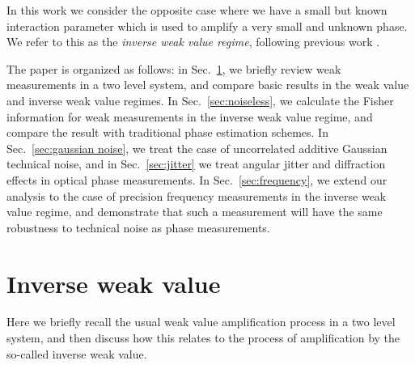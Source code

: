 In this work we consider the opposite case where we have a small but known interaction parameter which is used to amplify a very small and unknown phase.  We refer to this as the \emph{inverse weak value regime}, following previous work \cite{Starling2010a,Dressel2013,Lyons2015,Kofman2012}. 

The paper is organized as follows: in Sec.~\ref{sec:inverse weak values}, we briefly review weak measurements in a two level system, and compare basic results in the weak value and inverse weak value regimes.  In Sec.~\ref{sec:noiseless}, we calculate the Fisher information for weak measurements in the inverse weak value regime, and compare the result with traditional phase estimation schemes. In Sec.~\ref{sec:gaussian noise}, we treat the case of uncorrelated additive Gaussian technical noise, and in Sec.~\ref{sec:jitter} we treat angular jitter and diffraction effects in optical phase measurements.  In Sec.~\ref{sec:frequency}, we extend our analysis to the case of precision frequency measurements in the inverse weak value regime, and demonstrate that such a measurement will have the same robustness to technical noise as phase measurements.

\section{Inverse weak value}\label{sec:inverse weak values}
Here we briefly recall the usual weak value amplification process in a two level system, and then discuss how this relates to the process of amplification by the so-called inverse weak value.  

